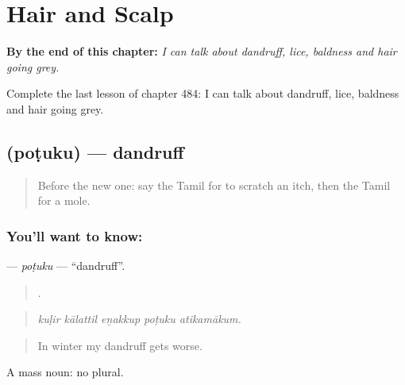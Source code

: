 
\chapter{Hair and Scalp}
\label{ch:ta-hair-and-scalp}

\begin{chapteropening}
\textbf{By the end of this chapter:} \emph{I can talk about dandruff, lice, baldness and hair going grey.}

Complete the last lesson of chapter 484: I can talk about dandruff, lice, baldness and hair going grey.
\end{chapteropening}

\section[\texorpdfstring{\ta{பொடுகு} (poṭuku)}{பொடுகு (poṭuku)}]{ (poṭuku) — dandruff}

\label{lesson:TA-C484-potuku}



\begin{quote}
Before the new one: say the Tamil for to scratch an itch, then the Tamil for a mole.
\end{quote}

\subsection*{You'll want to know: }
\textbf{} — \emph{poṭuku} — \textquotedblleft{}dandruff\textquotedblright{}.

\begin{quote}
    .
\end{quote}

\begin{quote}
\emph{kuḷir kālattil eṉakkup poṭuku atikamākum.}
\end{quote}

\begin{quote}
In winter my dandruff gets worse.
\end{quote}

A mass noun: no plural.

